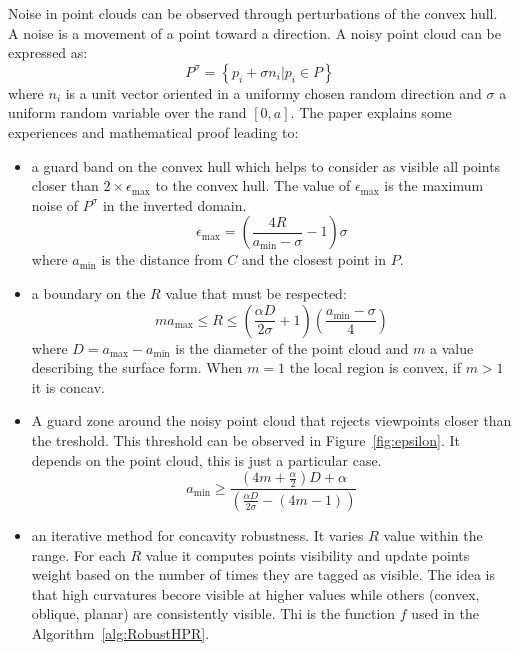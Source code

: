 Noise in point clouds can be observed through perturbations of the convex hull. A noise is a movement of a point toward a direction. A noisy point cloud can be expressed as:
\begin{equation*}
  P^\sigma = \left\lbrace p_i + \sigma n_i | p_i \in P  \right\rbrace
\end{equation*}
where $n_i$ is a unit vector oriented in a uniformy chosen random direction and $\sigma$ a uniform random variable over the rand $[0, a]$. The \cite{vis2} paper explains some experiences and mathematical proof leading to:
\begin{itemize}
  \item a guard band on the convex hull which helps to consider as visible all points closer than $2 \times \epsilon_{\text{max}}$ to the convex hull. The value of $\epsilon_\text{max}$ is the maximum noise of $P^\sigma$ in the inverted domain.
    \begin{equation*}
      \epsilon_\text{max} = \left( \frac{4R}{a_\text{min} - \sigma} - 1 \right) \sigma
    \end{equation*}
    where $a_\text{min}$ is the distance from $C$ and the closest point in $P$.
  \item a boundary on the $R$ value that must be respected:
    \begin{equation*}
      ma_{\text{max}} \leq R \leq \left( \frac{\alpha D}{2 \sigma} + 1 \right) \left( \frac{a_{\text{min}} - \sigma}{4} \right)
    \end{equation*}
    where $D = a_\text{max} - a_\text{min}$ is the diameter of the point cloud and $m$ a value describing the surface form. When $m = 1$ the local region is convex, if $m > 1$ it is concav.
  \item A guard zone around the noisy point cloud that rejects viewpoints closer than the treshold. This threshold can be observed in Figure~\ref{fig:epsilon}. It depends on the point cloud, this is just a particular case.
    \begin{equation*}
      a_\text{min} \geq \frac{\left(4m + \frac{\alpha}{2} \right) D + \alpha}{\left(\frac{\alpha D}{2 \sigma} - (4m - 1)\right)}
    \end{equation*}
  \item an iterative method for concavity robustness. It varies $R$ value within the range. For each $R$ value it computes points visibility and update points weight based on the number of times they are tagged as visible. The idea is that high curvatures becore visible at higher values while others (convex, oblique, planar) are consistently visible. Thi is the function $f$ used in the Algorithm~\ref{alg:RobustHPR}.
\end{itemize}

